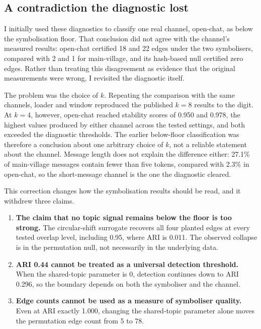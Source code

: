 \documentclass[10pt]{article}
\begin{document}
\subsection{A contradiction the diagnostic lost}

I initially used these diagnostics to classify one real channel, open-chat, as below the
symbolisation floor. That conclusion did not agree with the channel's measured results: open-chat
certified 18 and 22 edges under the two symbolisers, compared with 2 and 1 for main-village, and its
hash-based null certified zero edges. Rather than treating this disagreement as evidence that the
original measurements were wrong, I revisited the diagnostic itself.

The problem was the choice of $k$. Repeating the comparison with the same channels, loader and window
reproduced the published $k=8$ results to the digit. At $k=4$, however, open-chat reached stability
scores of 0.950 and 0.978, the highest values produced by either channel across the tested settings,
and both exceeded the diagnostic thresholds. The earlier below-floor classification was therefore a
conclusion about one arbitrary choice of $k$, not a reliable statement about the channel. Message
length does not explain the difference either: 27.1\% of main-village messages contain fewer than
five tokens, compared with 2.3\% in open-chat, so the short-message channel is the one the diagnostic
cleared.

This correction changes how the symbolisation results should be read, and it withdrew three claims.

\begin{enumerate}
\item \textbf{The claim that no topic signal remains below the floor is too strong.} The
circular-shift surrogate recovers all four planted edges at every tested overlap level, including
0.95, where ARI is 0.011. The observed collapse is in the permutation null, not necessarily in the
underlying data.
\item \textbf{ARI 0.44 cannot be treated as a universal detection threshold.} When the shared-topic
parameter is 0, detection continues down to ARI 0.296, so the boundary depends on both the
symboliser and the channel.
\item \textbf{Edge counts cannot be used as a measure of symboliser quality.} Even at ARI exactly
1.000, changing the shared-topic parameter alone moves the permutation edge count from 5 to 78.
\end{enumerate}
\end{document}
